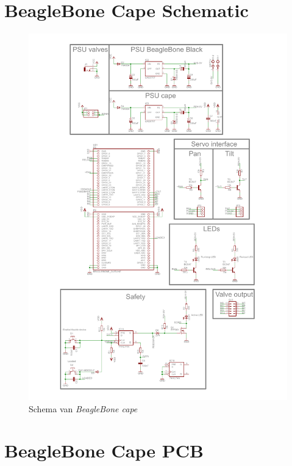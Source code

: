 \chapter{BeagleBone Cape Schematic}
\label{app:cape-schematic}

\begin{figure}
    \includegraphics[scale=.75]{appendix/BeagleBoneCape_schematic.pdf}
    \caption{Schema van \emph{BeagleBone cape}}
\end{figure}

\chapter{BeagleBone Cape PCB}
\label{app:cape-pcb}

